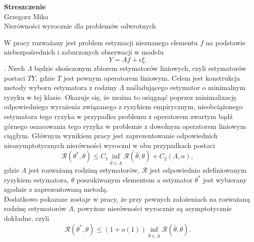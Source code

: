 \documentclass[]{article}
\begin{document}
\begin{center}
	\huge{{\bf Streszczenie}}\\ Grzegorz Mika\\Nierówności wyrocznie dla problemów odwrotnych
\end{center}
\vspace{1cm}
W pracy rozważany jest problem estymacji nieznanego elementu $f$ na podstawie niebezpośrednich i zaburzonych obserwacji w modelu 
\begin{displaymath}
Y = Af + \epsilon\xi.
\end{displaymath}. Niech $\Lambda$ będzie skończonym zbiorem estymatorów liniowych, czyli estymatorów postaci $TY$, gdzie $T$ jest pewnym operatorem liniowym. Celem jest konstrukcja metody wyboru estymatora z rodziny $\Lambda$ naśladującego estymator o minimalnym ryzyku w tej klasie. Okazuje się, że można to osiągnąć poprzez minimalizację odpowiedniego wyrażenia związanego z ryzykiem empirycznym, nieobciążonego estymatora tego ryzyka w przypadku problemu z operatorem zwartym bądź górnego oszacowania tego ryzyka w problemie z dowolnym operatorem liniowym ciągłym. Głównym wynikiem pracy jest zaprezentowanie odpowiednich nieasymptotycznych nierówności wyroczni w obu przypadkach postaci 
\begin{displaymath}
\mathcal{R}(\theta^*,\theta)\leq C_1 \inf_{\hat{\theta} \in \Lambda}\mathcal{R}(\hat{\theta},\theta)+C_2(\Lambda,n),
\end{displaymath}
gdzie $\Lambda$ jest rozważaną rodziną estymatorów, $\mathcal{R}$ jest odpowiednio zdefiniowanym ryzykiem estymatora, $\theta$ poszukiwanym elementem a estymator $\theta^*$ jest wybierany zgodnie z zaprezentowaną metodą. \\
Dodatkowo pokazane zostaje w pracy, że przy pewnych założeniach na rozważaną rodzinę estymatorów $\Lambda$, powyższe nierówności wyrocznie są asymptotycznie dokładne, czyli
\begin{equation}\label{aoracle}
\mathcal{R}(\theta^*,\theta)\leq(1+o(1))\inf_{\hat{\theta} \in \Lambda}\mathcal{R}(\hat{\theta},\theta).
\end{equation}
\end{document}

